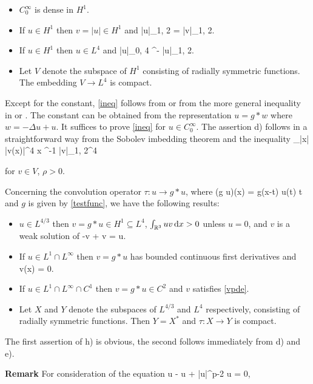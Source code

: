 \begin{itemize}
\item $C_0^\infty$ is dense in $H^1$.
\item If $u \in H^1$ then $v = |u| \in H^1$ and
\be |u|_{1, 2} = |v|_{1, 2}. \ee
\item If $u \in H^1$ then $u \in L^4$ and
\be\label{ineq} |u|_{0, 4} ^{-\half} |u|_{1, 2}. \ee
\item Let $V$ denote the subspace of $H^1$ consisting of radially symmetric
functions. The embedding $V \to L^4$ is compact.
\end{itemize}

Except for the constant, \eqref{ineq} follows from \cite{Ladyzhenskaya} or from
the more general inequality in \cite{nirenberg} or \cite{friedman}. The constant
can be obtained from the representation $u = g\ast w$ where $w = - \Delta u +
u$. It suffices to prove \eqref{ineq} for $u \in C_0^\infty$. The assertion d)
follows in a straightforward way from the Sobolev imbedding theorem and the
inequality
\pi \int_{|x|\geq \rho} |v(x)|^4 \diff x \rho^{-1} |v|_{1, 2}^4 \ee

for $v \in V$, $\rho > 0$.

    Concerning the convolution operator $\tau : u \to g \ast u$, where 
    \be (g \ast u)(x) = \intrrr g(x-t) u(t) \diff t \ee
    and $g$ is given by \eqref{testfunc}, we have the following results:

\begin{itemize}
\item $u \in L^{4/3}$ then $v = g \ast u \in H^1 \subseteq L^4$, $\int_{\mathbb{R}^3} u v
\mathop{}\!\mathrm{d} x > 0$ unless $u = 0$, and $v$ is a weak solution of
\be\label{vpde} -\Delta v + v = u. \ee
\item If $u \in L^1 \cap L^\infty$ then $v = g \ast u$ has bounded continuous
first derivatives and
\be {} v(x) = 0. \ee
\item If $u \in L^1 \cap L^\infty \cap C^1$ then $v = g \ast u \in C^2$ and $v$
satisfies \eqref{vpde}.
\item Let $X$ and $Y$ denote the subspaces of $L^{4/3}$ and $L^4$ respectively,
consisting of radially symmetric functions. Then $Y = X^*$ and $\tau : X \to Y$
is compact.
\end{itemize}

The first assertion of h) is obvious, the second follows immediately from d) and
e).

\textbf{Remark} For consideration of the equation
\be\label{upde2} \Delta u - u + |u|^{p-2} u = 0,\ee

